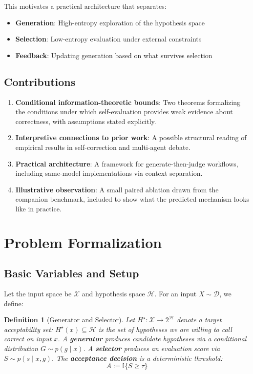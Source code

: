 \documentclass[11pt]{article}
\newtheorem{definition}[theorem]{Definition}
\begin{document}
This motivates a practical architecture that separates:
\begin{itemize}
    \item \textbf{Generation}: High-entropy exploration of the hypothesis space
    \item \textbf{Selection}: Low-entropy evaluation under external constraints
    \item \textbf{Feedback}: Updating generation based on what survives selection
\end{itemize}

\subsection{Contributions}

\begin{enumerate}
    \item \textbf{Conditional information-theoretic bounds}: Two theorems formalizing the conditions under which self-evaluation provides weak evidence about correctness, with assumptions stated explicitly.
    \item \textbf{Interpretive connections to prior work}: A possible structural reading of empirical results in self-correction and multi-agent debate.
    \item \textbf{Practical architecture}: A framework for generate-then-judge workflows, including same-model implementations via context separation.
    \item \textbf{Illustrative observation}: A small paired ablation drawn from the companion benchmark, included to show what the predicted mechanism looks like in practice.
\end{enumerate}

\section{Problem Formalization}

\subsection{Basic Variables and Setup}

Let the input space be $\mathcal{X}$ and hypothesis space $\mathcal{H}$. For an input $X \sim \mathcal{D}$, we define:

\begin{definition}[Generator and Selector]
Let $H^\star: \mathcal{X} \to 2^{\mathcal{H}}$ denote a target \emph{acceptability set}: $H^\star(x) \subseteq \mathcal{H}$ is the set of hypotheses we are willing to call correct on input $x$. A \textbf{generator} produces candidate hypotheses via a conditional distribution $G \sim p(g \mid x)$. A \textbf{selector} produces an evaluation score via $S \sim p(s \mid x, g)$. The \textbf{acceptance decision} is a deterministic threshold:
\begin{equation}
A := \mathbb{I}\{S \geq \tau\}
\end{equation}
\end{definition}
\end{document}
